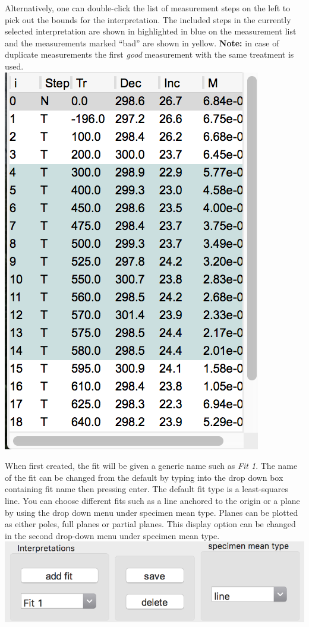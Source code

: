 Alternatively, one can double-click the list of measurement steps on the
left to pick out the bounds for the interpretation. The included steps
in the currently selected interpretation are shown in highlighted in
blue on the measurement list and the measurements marked ``bad'' are
shown in yellow. \textbf{Note:} in case of duplicate measurements the
first \emph{good} measurement with the same treatment is used.\\
\includegraphics{./images/DataBox.png}

When first created, the fit will be given a generic name such as
\emph{Fit 1}. The name of the fit can be changed from the default by
typing into the drop down box containing fit name then pressing enter.
The default fit type is a least-squares line. You can choose different
fits such as a line anchored to the origin or a plane by using the drop
down menu under specimen mean type. Planes can be plotted as either
poles, full planes or partial planes. This display option can be changed
in the second drop-down menu under specimen mean type.
\includegraphics{./images/SpecimenMeanType.png}

